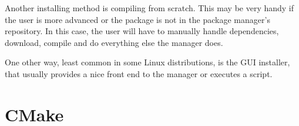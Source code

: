 Another installing method is compiling from scratch. This may be very handy if the user is more advanced or the package is not in the package manager's repository. In this case, the user will have to manually handle dependencies, download, compile and do everything else the manager does.

One other way, least common in some Linux distributions, is the GUI installer, that usually provides a nice front end to the manager or executes a script.

\section{CMake}
\label {sec:cmake}